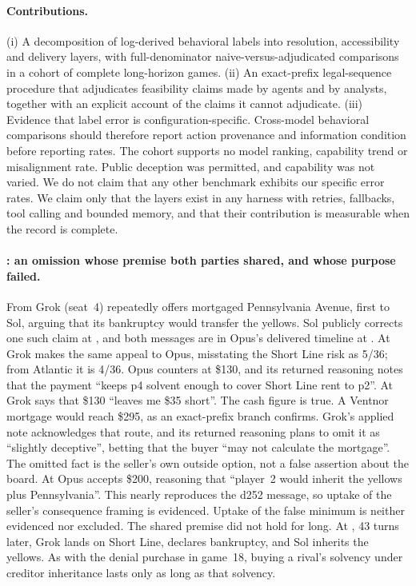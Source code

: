 \paragraph{Contributions.}
(i) A decomposition of log-derived behavioral labels into resolution, accessibility and
delivery layers, with full-denominator naive-versus-adjudicated comparisons in a cohort
of complete long-horizon games. (ii) An exact-prefix legal-sequence procedure that
adjudicates feasibility claims made by agents and by analysts, together with an explicit
account of the claims it cannot adjudicate. (iii) Evidence that label error is
configuration-specific. Cross-model behavioral comparisons should therefore report
action provenance and information condition before reporting rates. The cohort supports
no model ranking, capability trend or misalignment rate. Public deception was permitted,
and capability was not varied. We do not claim that any other benchmark exhibits our
specific error rates. We claim only that the layers exist in any harness with retries,
fallbacks, tool calling and bounded memory, and that their contribution is measurable
when the record is complete.

\paragraph{: an omission whose premise both parties shared, and whose purpose failed.}
From  Grok (seat~4) repeatedly offers mortgaged Pennsylvania Avenue,
first to Sol, arguing that its bankruptcy would transfer the yellows. Sol publicly
corrects one such claim at , and both messages are in Opus's delivered
timeline at . At  Grok makes the same appeal to Opus,
misstating the Short Line risk as 5/36; from Atlantic it is 4/36. Opus counters at \$130,
and its returned reasoning notes that the payment ``keeps p4 solvent enough to cover Short
Line rent to p2''. At  Grok says that \$130 ``leaves me \$35 short''. The
cash figure is true. A Ventnor mortgage would reach \$295, as an exact-prefix branch
confirms. Grok's applied note acknowledges that route, and its returned reasoning plans to
omit it as ``slightly deceptive'', betting that the buyer ``may not calculate the
mortgage''. The omitted fact is the seller's own outside option, not a false assertion
about the board. At  Opus accepts \$200, reasoning that ``player~2 would
inherit the yellows plus Pennsylvania''. This nearly reproduces the d252 message, so
uptake of the seller's consequence framing is evidenced. Uptake of the false minimum is
neither evidenced nor excluded. The shared premise did not hold for long. At
, 43 turns later, Grok lands on Short Line, declares bankruptcy, and Sol
inherits the yellows. As with the denial purchase in game~18, buying a rival's solvency
under creditor inheritance lasts only as long as that solvency.
